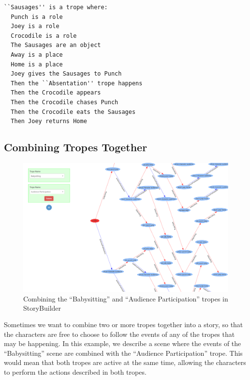 \documentclass[11pt]{report}
\begin{document}
\begin{minipage}{\textwidth}
\begin{lstlisting}[label={list:sausages-trope-subtrope},caption={The ``Sausages''
trope, redefined with a subtrope}]
``Sausages'' is a trope where:
  Punch is a role
  Joey is a role
  Crocodile is a role
  The Sausages are an object
  Away is a place
  Home is a place
  Joey gives the Sausages to Punch
  Then the ``Absentation'' trope happens
  Then the Crocodile appears
  Then the Crocodile chases Punch
  Then the Crocodile eats the Sausages
  Then Joey returns Home
\end{lstlisting}
\end{minipage}

\subsection{Combining Tropes Together}
\label{sec:combining-tropes}

\begin{figure}[!t]
\centerline{\includegraphics[width=\textwidth]{trope-combining.png}}
\caption{Combining the ``Babysitting'' and ``Audience Participation'' tropes in StoryBuilder}\label{fig:combining-tropes}
\end{figure}

Sometimes we want to combine two or more tropes together into a story, so that
the characters are free to choose to follow the events of any of the tropes that
may be happening. In this example, we describe a scene where the events of the
``Babysitting'' scene are combined with the ``Audience Participation'' trope.
This would mean that both tropes are active at the same time, allowing the
characters to perform the actions described in both tropes.
\end{document}
